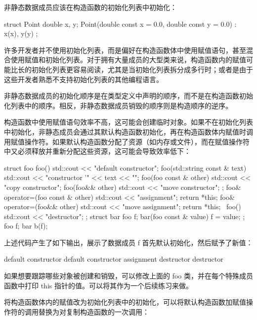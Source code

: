 非静态数据成员应该在构造函数的初始化列表中初始化：

\begin{cpp}
struct Point
{
    double x, y;
    Point(double const x = 0.0, double const y = 0.0) : x(x), y(y)  {}
};
\end{cpp}

许多开发者并不使用初始化列表，而是偏好在构造函数体中使用赋值语句，甚至混合使用赋值和初始化列表。对于拥有大量成员的大型类来说，构造函数内的赋值可能比长的初始化列表更容易阅读，尤其是当初始化列表拆分成多行时；或者是由于这些开发者熟悉不支持初始化列表的其他编程语言。

\begin{myNotic}
非静态数据成员的初始化顺序是在类型定义中声明的顺序，而不是在构造函数初始化列表中的顺序。相反，非静态数据成员销毁的顺序则是构造顺序的逆序。
\end{myNotic}

构造函数中使用赋值语句效率不高，这可能会创建临时对象。如果不在初始化列表中初始化，非静态成员会通过其默认构造函数初始化，再在构造函数体内赋值时调用赋值操作符。如果默认构造函数分配了资源（如内存或文件），而在赋值操作符中又必须释放并重新分配这些资源，这可能会导致效率低下：

\begin{cpp}
struct foo
{
    foo()
    { std::cout << "default constructor\n"; }
    foo(std::string const & text)
    { std::cout << "constructor '" << text << "\n"; }
    foo(foo const & other)
    { std::cout << "copy constructor\n"; }
    foo(foo&& other)
    { std::cout << "move constructor\n"; };
    foo& operator=(foo const & other)
    { std::cout << "assignment\n"; return *this; }
    foo& operator=(foo&& other)
    { std::cout << "move assignment\n"; return *this;}
    ~foo()
    { std::cout << "destructor\n"; }
};
struct bar
{
    foo f;
    bar(foo const & value)
    {
        f = value;
    }
};
foo f;
bar b(f);
\end{cpp}

上述代码产生了如下输出，展示了数据成员 f 首先默认初始化，然后赋予了新值：

\begin{shell}
default constructor
default constructor
assignment
destructor
destructor
\end{shell}

如果想要跟踪哪些对象被创建和销毁，可以修改上面的 foo 类，并在每个特殊成员函数中打印 this 指针的值。可以将其作为一个后续练习来做。

将构造函数体内的赋值改为初始化列表中的初始化，可以将默认构造函数加赋值操作符的调用替换为对复制构造函数的一次调用：

